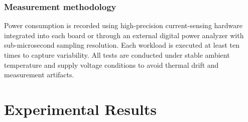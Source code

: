                 \begin{table}[tp]
                    \caption{Summary of characteristics of the applications in the benchmark.}
                    \label{tbl:x-heep_benchmarks}
                    \centering
                \end{table}
            
            \subsubsection*{Measurement methodology}
            
                Power consumption is recorded using high-precision current-sensing hardware integrated into each board or through an external digital power analyzer with sub-microsecond sampling resolution. Each workload is executed at least ten times to capture variability. All tests are conducted under stable ambient temperature and supply voltage conditions to avoid thermal drift and measurement artifacts.

    \section{Experimental Results}
    \label{sec:experimental_results}
        
